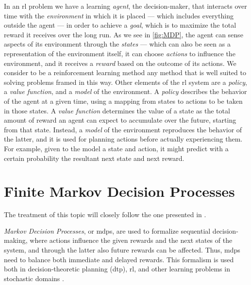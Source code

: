 In an \acrshort{rl} problem we have a learning \emph{agent}, the decision-maker, that interacts over time with the \emph{environment} in which it is placed --- which includes everything outside the agent --- in order to achieve a \emph{goal}, which is to maximize the total reward it receives over the long run. As we see in \autoref{fig:MDP}, the agent can sense aspects of its environment through the \emph{states} --- which can also be seen as a representation of the environment itself, it can choose \emph{actions} to influence the environment, and it receives a \emph{reward} based on the outcome of its actions. We consider to be a reinforcement learning method any method that is well suited to solving problems framed in this way. Other elements of the \acrshort{rl} system are a \emph{policy}, a \emph{value function}, and a \emph{model} of the environment. A \emph{policy} describes the behavior of the agent at a given time, using a mapping from states to actions to be taken in those states. A \emph{value function} determines the value of a state as the total amount of reward an agent can expect to accumulate over the future, starting from that state. Instead, a \emph{model} of the environment reproduces the behavior of the latter, and it is used for planning actions before actually experiencing them. For example, given to the model a state and action, it might predict with a certain probability the resultant next state and next reward.


\section{Finite Markov Decision Processes}

The treatment of this topic will closely follow the one presented in \cite{SuttonBarto}.

\emph{Markov Decision Processes}, or \acrshort{mdp}s, are used to formalize sequential decision-making, where actions influence the given rewards and the next states of the system, and through the latter also future rewards can be affected. Thus, \acrshort{mdp}s need to balance both immediate and delayed rewards. This formalism is used both in decision-theoretic planning (\acrshort{dtp}), \acrshort{rl}, and other learning problems in stochastic domains \cite{WierOtter12RLStateOfTheArt}.

